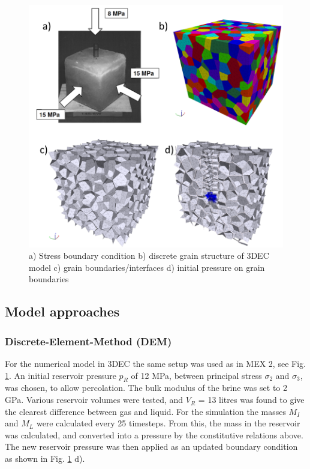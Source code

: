 \begin{figure}[!ht]
\centering
\includegraphics[width=1\textwidth]{figures/mex4-dem-setup.png}
\caption{a) Stress boundary condition b) discrete grain structure of 3DEC model c) grain boundaries/interfaces d) initial pressure on grain boundaries}
\label{fig:ME4-dem-setup}
\end{figure}

\subsection{Model approaches}
\subsubsection*{Discrete-Element-Method (DEM)}

For the numerical model in 3DEC the same setup was used as in MEX 2, see Fig. \ref{fig:ME4-dem-setup}. An initial reservoir pressure $p_R$ of 12 MPa, between principal stress $\sigma_2$ and $\sigma_3$, was chosen, to allow percolation. The bulk modulus of the brine was set to 2 GPa. Various reservoir volumes were tested, and  $V_R$ = 13 litres was found to give the clearest difference between gas and liquid.
For the simulation the masses $M_I$ and $M_L$ were calculated every 25 timesteps. From this, the mass in the reservoir was calculated, and converted into a pressure by the constitutive relations above. The new reservoir pressure was then applied as an updated boundary condition as shown in Fig. \ref{fig:ME4-dem-setup} d). 

